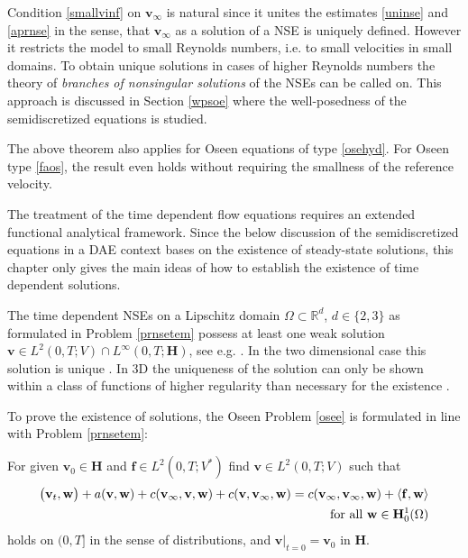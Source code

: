\documentclass[a4paper,10pt,BCOR=15mm]{scrbook}
\providecommand{\dupa}[2]{\langle #1,#2 \rangle}
\begin{document}
\begin{rem}
 Condition \eqref{smallvinf} on $\mathbf v_\infty$ is natural since it unites the estimates \eqref{uninse} and \eqref{aprnse} in the sense, that $\mathbf v_\infty$ as a solution of a NSE is uniquely defined. However it restricts the model to small Reynolds numbers, i.e. to small velocities in small domains. To obtain unique solutions in cases of higher Reynolds numbers the theory of \textit{branches of nonsingular solutions} of the NSEs can be called on. This approach is discussed in Section \ref{wpsoe} where the well-posedness of the semidiscretized equations is studied.

\end{rem}

\begin{rem}
 The above theorem also applies for Oseen equations of type \eqref{osehyd}. For Oseen type \eqref{faos}, the result even holds without requiring the smallness of the reference velocity.
\end{rem}

The treatment of the time dependent flow equations requires an extended functional analytical framework. Since the below discussion of the semidiscretized equations in a DAE context bases on the existence of steady-state solutions, this chapter only gives the main ideas of how to establish the existence of time dependent solutions.

The time dependent NSEs on a Lipschitz domain $\Omega \subset \mathbb R ^d$, $d\in \{2,3\}$ as formulated in Problem \ref{prnsetem} possess at least one weak solution $\mathbf v \in L^2(0,T;V) \cap L^\infty (0,T;\mathbf H)$, see e.g. \cite[Thm. 3.1]{tema}. In the two dimensional case this solution is unique \cite[Thm. 3.2]{tema}. In 3D the uniqueness of the solution can only be shown within a class of functions of higher regularity than necessary for the existence \cite[Thm. 3.4]{tema}.

To prove the existence of solutions, the Oseen Problem \ref{osee} is formulated in line with Problem \ref{prnsetem}:
\begin{prob}\label{proseonlyv}
For given $\mathbf v_0 \in \mathbf H$ and $\mathbf f \in L^2(0,T;V^*)$ find $\mathbf v \in L^2(0,T;V)$ such that
\begin{align*}
\bigl( \mathbf v_t, \mathbf w \bigr) + a(\mathbf v, \mathbf w) + c(\mathbf v_\infty,\mathbf v, \mathbf w)+c(\mathbf v,\mathbf v_\infty, \mathbf w)=c(\mathbf v_\infty,\mathbf v_\infty, \mathbf w)+\dupa{\mathbf f}{\mathbf w}  \\
\quad \text{for all } \mathbf w \in \mathbf H_0^1(\Omega)\notag
\end{align*}
holds on $(0,T]$ in the sense of distributions, and $\mathbf v \vert _{t=0} = \mathbf v_0$ in $\mathbf H$.
\end{prob}
\end{document}
